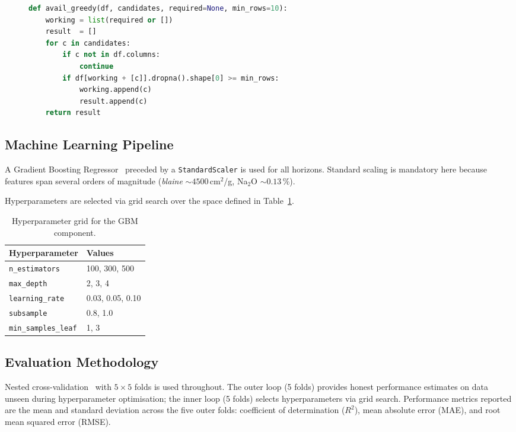 \documentclass[preprint,12pt]{elsarticle}
\begin{document}
\begin{figure}[H]
\begin{lstlisting}[language=Python, basicstyle=\small\ttfamily,
                   frame=single, caption={Greedy compatibility feature selection.},
                   label={alg:greedy}]
def avail_greedy(df, candidates, required=None, min_rows=10):
    working = list(required or [])
    result  = []
    for c in candidates:
        if c not in df.columns:
            continue
        if df[working + [c]].dropna().shape[0] >= min_rows:
            working.append(c)
            result.append(c)
    return result
\end{lstlisting}
\end{figure}

\subsection{Machine Learning Pipeline}
\label{sec:pipeline}

A Gradient Boosting Regressor~\cite{gbm_friedman2001} preceded by a
\texttt{StandardScaler} is used for all horizons.
Standard scaling is mandatory here because features span several orders of
magnitude (\textit{blaine} $\sim 4500$\,cm$^2$/g, Na$_2$O $\sim 0.13$\,\%).

Hyperparameters are selected via grid search over the space defined in
Table~\ref{tab:grid}.

\begin{table}[H]
\centering
\caption{Hyperparameter grid for the GBM component.}
\label{tab:grid}
\begin{tabular}{ll}
\toprule
Hyperparameter       & Values \\
\midrule
\texttt{n\_estimators}      & 100, 300, 500 \\
\texttt{max\_depth}         & 2, 3, 4 \\
\texttt{learning\_rate}     & 0.03, 0.05, 0.10 \\
\texttt{subsample}          & 0.8, 1.0 \\
\texttt{min\_samples\_leaf} & 1, 3 \\
\bottomrule
\end{tabular}
\end{table}

\subsection{Evaluation Methodology}
\label{sec:evaluation}

Nested cross-validation~\cite{nested_cv} with $5 \times 5$ folds is used
throughout.
The outer loop (5 folds) provides honest performance estimates on data unseen
during hyperparameter optimisation; the inner loop (5 folds) selects
hyperparameters via grid search.
Performance metrics reported are the mean and standard deviation across the five
outer folds: coefficient of determination ($R^2$), mean absolute error (MAE),
and root mean squared error (RMSE).
\end{document}
